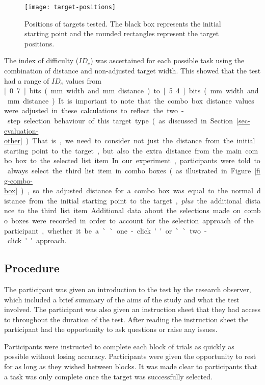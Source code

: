 \documentclass{elsart}
\begin{document}
\begin{figure}
	\centering
	\texttt{[image: target-positions]}
	\caption{Positions of targets tested. The black box represents the
	initial starting point and the rounded rectangles represent the
	target positions.}
	\label{fig-target-positions}
\end{figure}


The index of difficulty (\(\mathit{ID}_{e}\)) was ascertained for each
possible task using the combination of distance and non-adjusted target
width. This showed that the test had a range of \(\mathit{ID}_{e}\)
values from \unit[0.7]{bits} (\unit[63]{mm} width and \unit[160]{mm}
distance) to \unit[5.4]{bits} (\unit[4]{mm} width and \unit[40]{mm}
distance). It is important to note that the combo box distance values
were adjusted in these calculations to reflect the two-step selection
behaviour of this target type (as discussed in
Section~\ref{sec-evaluation-other}). That is, we need to consider not
just the distance from the initial starting point to the target, but
also the extra distance from the main combo box to the selected list
item. In our experiment, participants were told to always select the
third list item in combo boxes (as illustrated in
Figure~\ref{fig-combo-box}), so the adjusted distance for a combo box
was equal to the normal distance from the initial starting point to the
target, \emph{plus} the additional distance to the third list item.
Additional data about the selections made on combo boxes were recorded
in order to account for the selection approach of the participant,
whether it be a ``one-click'' or ``two-click'' approach.


\subsection{Procedure}
\label{sec-method-procedure}

The participant was given an introduction to the test by the research
observer, which included a brief summary of the aims of the study and
what the test involved. The participant was also given an instruction
sheet that they had access to throughout the duration of the test. After
reading the instruction sheet the participant had the opportunity to ask
questions or raise any issues.

Participants were instructed to complete each block of trials as quickly
as possible without losing accuracy. Participants were given the
opportunity to rest for as long as they wished between blocks. It was
made clear to participants that a task was only complete once the target
was successfully selected.
\end{document}
